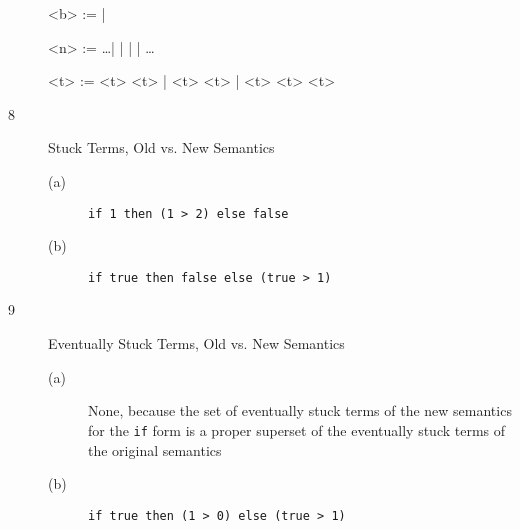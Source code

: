 \documentclass{article}
\begin{document}
\begin{description}
\begin{grammar}
      <b> :=  | 

      <n> := \ldots |  |  |  | \ldots

      <t> := <t> \lit*{+} <t> | <t> \lit*{>} <t> |  <t>  <t>  <t>
    \end{grammar}

  \item[8]{Stuck Terms, Old vs. New Semantics}
    \begin{description}
      \item[(a)] \verb|if 1 then (1 > 2) else false|
      \item[(b)] \verb|if true then false else (true > 1)|
    \end{description}

  \item[9]{Eventually Stuck Terms, Old vs. New Semantics}
    \begin{description}
      \item[(a)] None, because the set of eventually stuck terms of the new semantics for the \verb|if| form is a proper superset of the eventually stuck terms of the original semantics
      \item[(b)] \verb|if true then (1 > 0) else (true > 1)|
    \end{description}


\end{description}
\end{document}
